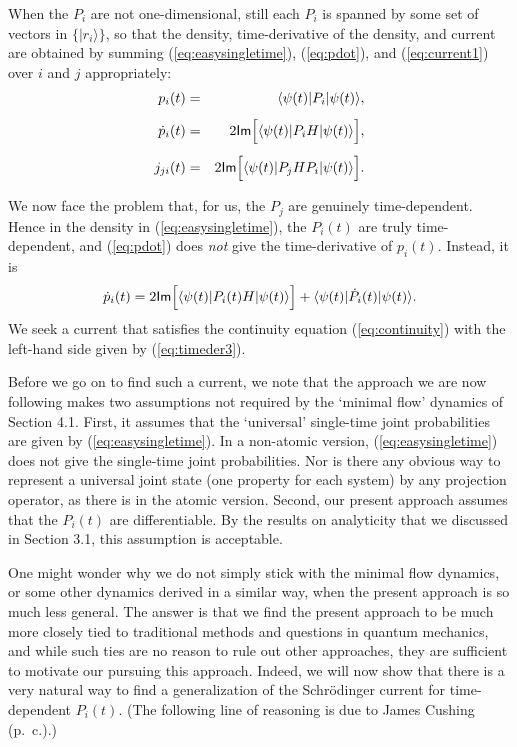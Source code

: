 \documentclass[12pt]{article}
\newcommand{\be}{\begin{equation}}
\newcommand{\ee}{\end{equation}}
\renewcommand{\Im}{\mbox{{\sf Im}}}                             %
\newcommand{\bra}[1]{\langle #1\vert}                           %
\newcommand{\ket}[1]{\vert #1\rangle}                           %
\begin{document}
When the $P_i$ are not one-dimensional, still each $P_i$ is spanned by 
some set of vectors in $\{\ket{r_i}\}$, so that the density, 
time-derivative of the density, and current are obtained by summing 
(\ref{eq:easysingletime}), (\ref{eq:pdot}), and (\ref{eq:current1}) 
over $i$ and $j$ appropriately:
\begin{eqnarray}
  \label{eq:density2}
  p_i(t) & = & \bra{\psi(t)} P_i \ket{\psi(t)}, \\[1ex]
  \label{eq:timeder2}
  \dot{p}_i(t) & = & 2 \Im \Big[ \bra{\psi(t)} P_i H
  \ket{\psi(t)} \Big], \\[1ex]
  \label{eq:current2}
  j_{ji}(t) & = & 2 \Im \Big[ \bra{\psi(t)} P_j H P_i
  \ket{\psi(t)} \Big].
\end{eqnarray}

We now face the problem that, for us, the $P_j$ are genuinely
time-dependent.  Hence in the density in (\ref{eq:easysingletime}),
the $P_i(t)$ are truly time-dependent, and (\ref{eq:pdot}) does {\it
not} give the time-derivative of $p_i(t)$.  Instead, it is
\be
  \label{eq:timeder3}
  \dot{p}_i(t) = 2 \Im \Big[ \bra{\psi(t)} P_i(t) H \ket{\psi(t)} 
  \Big] + \bra{\psi(t)}\dot{P}_i(t)\ket{\psi(t)}.
\ee
We seek a current that satisfies the continuity equation 
(\ref{eq:continuity}) with the left-hand side given by 
(\ref{eq:timeder3}).

Before we go on to find such a current, we note that the approach we
are now following makes two assumptions not required by the `minimal
flow' dynamics of Section 4.1.  First, it assumes that the `universal'
single-time joint probabilities are given by (\ref{eq:easysingletime}).
In a non-atomic version, (\ref{eq:easysingletime}) does not give the
single-time joint probabilities.  Nor is there any obvious way to
represent a universal joint state (one property for each system) by
any projection operator, as there is in the atomic version.  Second,
our present approach assumes that the $P_i(t)$ are differentiable.  By
the results on analyticity that we discussed in Section 3.1, this
assumption is acceptable.

One might wonder why we do not simply stick with the minimal flow 
dynamics, or some other dynamics derived in a similar way, when the 
present approach is so much less general.  The answer is that we find 
the present approach to be much more closely tied to traditional 
methods and questions in quantum mechanics, and while such ties are no 
reason to rule out other approaches, they are sufficient to motivate 
our pursuing this approach.  Indeed, we will now show that there is a 
very natural way to find a generalization of the Schr\"odinger current 
for time-dependent $P_i(t)$.  (The following line of reasoning is due 
to James Cushing (p.~c.).)
\end{document}

